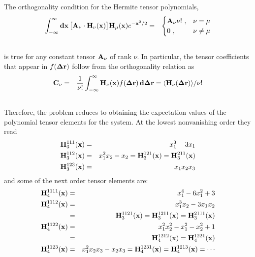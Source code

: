 \documentclass{article}
\begin{document}
The orthogonality condition for the Hermite tensor polynomials,
\begin{eqnarray}
\int_{-\infty}^{\infty}{\bf dx}\, \big[{\bf A}_\nu\cdot {\bf H}_\nu({\bf x})\big] {\bf
  H}_\mu({\bf x})e^{-{\bf x}^2/2} &=& \begin{cases}{\bf A}_\nu\nu !\ , & \nu=\mu
  \\ 0\ , & \nu\neq\mu \end{cases} \nonumber \\
&&\label{orthogonality}
\end{eqnarray}
is true for any constant tensor ${\bf A}_\nu$ of rank $\nu$.  In
particular, the tensor coefficients that appear in $f({\bf \Delta r})$
follow from the orthogonality relation as
\begin{eqnarray}
{\bf C}_\nu &=& \frac{1}{\nu!}\int_{-\infty}^{\infty} {\bf H}_\nu({\bf x})
f({\bf\Delta r})\, {\bf d\Delta r} =  \langle {\bf H}_\nu({\bf\Delta r})\rangle/\nu!\nonumber \\
&& \label{coefs}
\end{eqnarray}
Therefore, the problem reduces to obtaining the expectation values of
the polynomial tensor elements for the system. At the lowest
nonvanishing order they read
\begin{eqnarray}
\label{H3}
{\bf H}_3^{111}({\bf x}) &=& x_1^3 -3x_1 \nonumber \\
{\bf H}_3^{112}({\bf x}) &=& x_1^2x_2 -x_2 = {\bf H}_3^{121}({\bf x}) = {\bf
  H}_3^{211}({\bf x}) \nonumber \\
{\bf H}_3^{123}({\bf x}) &=& x_1x_2x_3 \nonumber \\
\end{eqnarray}
and some of the next order tensor elements are:
\begin{eqnarray}
\label{H4}
{\bf H}_4^{1111}({\bf x}) &=& x_1^4 -6x_1^2 + 3 \nonumber \\
{\bf H}_4^{1112}({\bf x}) &=& x_1^3x_2 - 3x_1x_2 \nonumber \\
&=& {\bf H}_3^{1121}({\bf x}) = {\bf H}_3^{1211}({\bf x}) = {\bf  H}_3^{2111}({\bf x}) \nonumber \\
{\bf H}_4^{1122}({\bf x}) &=& x_1^2x_2^2 - x_1^2 - x_2^2 + 1 \nonumber \\
&=& {\bf H}_4^{1212}({\bf x}) = {\bf  H}_4^{1221}({\bf x}) \nonumber \\
{\bf H}_4^{1123}({\bf x}) &=& x_1^2x_2x_3 - x_2x_3  = {\bf H}_4^{1231}({\bf x}) = {\bf H}_4^{1213}({\bf x}) = \cdots\nonumber \\
&& \label{H4}
\end{eqnarray}
\end{document}
